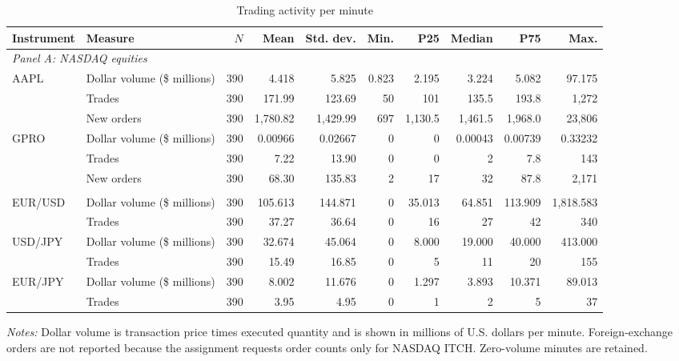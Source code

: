 \documentclass[11pt]{article}
\begin{document}
\begin{table}[H]
\centering
\caption{Trading activity per minute}
\label{tab:activity}
\scriptsize
\begin{threeparttable}
\begin{tabular}{@{}llrrrrrrrr@{}}
\toprule
Instrument & Measure & $N$ & Mean & Std. dev. & Min. & P25 & Median & P75 & Max.\\
\midrule
\multicolumn{10}{l}{\textit{Panel A: NASDAQ equities}}\\
AAPL & Dollar volume (\$ millions) & 390 & 4.418 & 5.825 & 0.823 & 2.195 & 3.224 & 5.082 & 97.175\\
     & Trades & 390 & 171.99 & 123.69 & 50 & 101 & 135.5 & 193.8 & 1,272\\
     & New orders & 390 & 1,780.82 & 1,429.99 & 697 & 1,130.5 & 1,461.5 & 1,968.0 & 23,806\\
GPRO & Dollar volume (\$ millions) & 390 & 0.00966 & 0.02667 & 0 & 0 & 0.00043 & 0.00739 & 0.33232\\
     & Trades & 390 & 7.22 & 13.90 & 0 & 0 & 2 & 7.8 & 143\\
     & New orders & 390 & 68.30 & 135.83 & 2 & 17 & 32 & 87.8 & 2,171\\
\addlinespace
\multicolumn{10}{l}{\textit{Panel B: Foreign exchange}}\\
EUR/USD & Dollar volume (\$ millions) & 390 & 105.613 & 144.871 & 0 & 35.013 & 64.851 & 113.909 & 1,818.583\\
        & Trades & 390 & 37.27 & 36.64 & 0 & 16 & 27 & 42 & 340\\
USD/JPY & Dollar volume (\$ millions) & 390 & 32.674 & 45.064 & 0 & 8.000 & 19.000 & 40.000 & 413.000\\
        & Trades & 390 & 15.49 & 16.85 & 0 & 5 & 11 & 20 & 155\\
EUR/JPY & Dollar volume (\$ millions) & 390 & 8.002 & 11.676 & 0 & 1.297 & 3.893 & 10.371 & 89.013\\
        & Trades & 390 & 3.95 & 4.95 & 0 & 1 & 2 & 5 & 37\\
\bottomrule
\end{tabular}
\begin{tablenotes}[flushleft]\footnotesize
\item \textit{Notes:} Dollar volume is transaction price times executed quantity and is shown in millions of U.S. dollars per minute. Foreign-exchange orders are not reported because the assignment requests order counts only for NASDAQ ITCH. Zero-volume minutes are retained.
\end{tablenotes}
\end{threeparttable}
\end{table}
\end{document}

